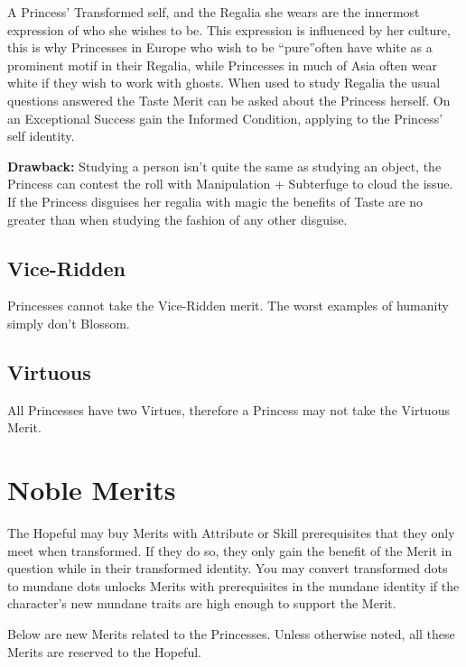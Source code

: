 A Princess' Transformed self, and the Regalia she wears are the innermost expression of who she wishes to be. This expression is influenced by her culture, this is why Princesses in Europe who wish to be \textquotedblleft pure\textquotedblright often have white as a prominent motif in their Regalia, while Princesses in much of Asia often wear white if they wish to work with ghosts. When used to study Regalia the usual questions answered the Taste Merit can be asked about the Princess herself. On an Exceptional Success gain the Informed Condition, applying to the Princess' self identity. 

\textbf{Drawback:} Studying a person isn't quite the same as studying an object, the Princess can contest the roll with Manipulation + Subterfuge to cloud the issue. If the Princess disguises her regalia with magic the benefits of Taste are no greater than when studying the fashion of any other disguise.

\subsection*{Vice-Ridden}

Princesses cannot take the Vice-Ridden merit. The worst examples of humanity simply don't Blossom.

\subsection*{Virtuous}

All Princesses have two Virtues, therefore a Princess may not take the Virtuous Merit.


\section*{Noble Merits} 
The Hopeful may buy Merits with Attribute or Skill prerequisites that they only meet when transformed. If they do so, they only gain the benefit of the Merit in question while in their transformed identity. You may convert transformed dots to mundane dots unlocks Merits with prerequisites in the mundane identity if the character's new mundane traits are high enough to support the Merit.

Below are new Merits related to the Princesses. Unless otherwise noted, all these Merits are reserved to the Hopeful. 

